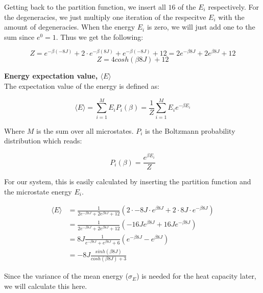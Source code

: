 \documentclass[../main.tex]{subfiles}
\begin{document}
    Getting back to the partition function, we insert all $16$ of the $E_i$ respectively. For the degeneracies, we just multiply one iteration of the respecitve $E_i$ with the amount of degeneracies. When the energy $E_i$ is zero, we will just add one to the sum since $e^0 = 1$. Thus we get the following:

    \[Z = e^{-\beta (-8J)} + 2 \cdot e^{-\beta (8J)} + e^{-\beta (-8J)} + 12 = 2e^{-\beta 8J} + 2e^{\beta 8J} + 12\]
    \[Z = 4cosh(\beta 8J) + 12\]

    \textbf{Energy expectation value, $\langle E \rangle$}\\
    The expectation value of the energy is defined as:

    \[\langle E \rangle = \sum_{i=1}^M E_i P_i(\beta) = \frac{1}{Z}\sum_{i=1}^M E_i e^{-\beta E_i}\]

    Where $M$ is the sum over all microstates. $P_i$ is the Boltzmann probability distribution which reads:

    \[P_i(\beta) = \frac{e^{\beta E_i}}{Z}\]

    For our system, this is easily calculated by inserting the partition function and the microstate energy $E_i$.

    \begin{align*}
      \langle E \rangle &= \frac{1}{2e^{-\beta 8J} + 2e^{\beta 8J} + 12} \left(2 \cdot -8J \cdot e^{\beta 8J} + 2\cdot 8J \cdot e^{-\beta8J}\right)\\
        &= \frac{1}{2e^{-\beta 8J} + 2e^{\beta 8J} + 12} \left(-16J e^{\beta8J} + 16Je^{-\beta 8J}\right)\\
        &= 8J \frac{1}{e^{-\beta 8J} + e^{\beta 8J} + 6}  \left(e^{-\beta8J} - e^{\beta 8J}\right)\\
        &= -8J\frac{sinh(\beta 8 J)}{cosh(\beta 8 J) + 3}
    \end{align*}

    Since the variance of the mean energy ($\sigma_E$) is needed for the heat capacity later, we will calculate this here.
\end{document}
